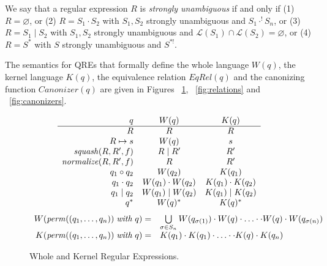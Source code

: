 \documentclass{svproc}
\newcommand{\squash}[3]{\ensuremath{\mathit{squash}(#1, #2, #3)}}
\newcommand{\perm}[2]{\ensuremath{\mathit{perm}(#1)\; \mathit{with}\; #2}}
\newcommand{\normalize}[3]{\ensuremath{\mathit{normalize}(#1, #2, #3)}}
\newcommand{\sep}{\ensuremath{\; | \;}}
\begin{document}
We say that a regular expression $R$ is \textit{strongly unambiguous} if and
only if (1) $R = \varnothing$, or (2) $R = S_1 \cdot S_2$ with $S_1, S_2$
strongly unambiguous and $S_1 \cdot^! S_n$, or (3) $R = S_1 \sep S_2$ with
$S_1, S_2$ strongly unambiguous and $\mathcal{L}(S_1) \cap \mathcal{L}(S_2) =
\varnothing$, or (4) $R = S^*$ with $S$ strongly unambiguous and $S^{*!}$.

The semantics for QREs that formally define the whole language $W(q)$, the
kernel language $K(q)$, the equivalence relation $EqRel(q)$ and the
canonizing function $Canonizer(q)$ are given in Figures ~\ref{fig:wk},
~\ref{fig:relations} and ~\ref{fig:canonizers}.
\begin{figure}[t]
  \centering
  \[
    \begin{array}{r@{\quad}c@{\quad}cc}
   
      q & W(q) & K(q) \\ \hline
      R & R & R \\
      R \mapsto s & W(q) & s \\
      \squash{R}{R'}{f} & R \sep R' & R' \\
      \normalize{R}{R'}{f} & R & R' \\
      q_1 \circ  q_2 & W(q_2) & K(q_1) \\
      q_1 \cdot q_2 & W(q_1) \cdot W(q_2) & K(q_1) \cdot K(q_2) \\
      q_1 \sep q_2 & W(q_1) \sep W(q_2) & K(q_1) \sep K(q_2) \\
      q^* & W(q)^* & K(q)^* \\
    \end{array}
  \]
\[
\begin{array}{r@{\quad}l}
W( \perm{(q_1, \ldots, q_n)}{q} ) = &
\bigcup \limits_{\sigma \in S_n} W(q_{\sigma(1)}) \cdot W(q) \cdot \ldots \cdot \cdot W(q) \cdot W(q_{\sigma(n)})
\\
K( \perm{(q_1, \ldots, q_n)}{q} ) = &
 K(q_1) \cdot K(q_1) \cdot \ldots \cdot \cdot K(q) \cdot K(q_n) 
\end{array}
\]
  \caption{Whole and Kernel Regular Expressions.}
  \label{fig:wk}
\end{figure}
\end{document}
